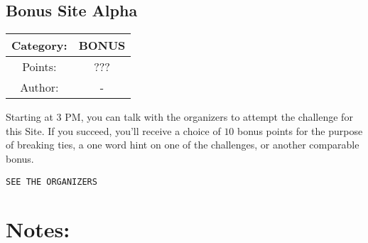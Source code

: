 \begin{center}
\section*{Bonus Site Alpha}
{\large
\begin{tabular}{| c c |}
\hline
Category: & BONUS\\\hline
Points: & ???\\\hline
Author: & -\\\hline
\end{tabular}
}
\end{center}
\vspace{0.5in}

{\large
Starting at 3 PM, you can talk with the organizers to attempt the challenge for this Site. If you succeed, you'll receive a choice of $10$ bonus points for the purpose of breaking ties, a one word hint on one of the challenges, or another comparable bonus.
}
\vspace{0.25in}
\begin{center}
  {\Large\tt SEE THE ORGANIZERS}
\end{center}

\vspace{0.25in}
\section*{Notes:}
